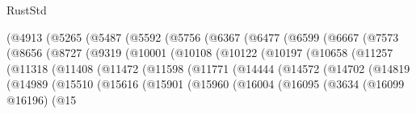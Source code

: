 \begin{lexlean}{RustStd}
\begin{coremodule}
                      (@4913
                        (@5265
                          (@5487
                            (@5592
                              (@5756
                                (@6367
                                  (@6477
                                    (@6599
                                      (@6667
                                        (@7573
                                          (@8656
                                            (@8727
                                              (@9319
                                                (@10001
                                                  (@10108
                                                    (@10122
                                                      (@10197
                                                        (@10658
                                                          (@11257
                                                            (@11318
                                                              (@11408
                                                                (@11472
                                                                  (@11598
                                                                    (@11771
                                                                      (@14444
                                                                        (@14572
                                                                          (@14702
                                                                            (@14819
                                                                              (@14989
                                                                                (@15510
                                                                                  (@15616
                                                                                    (@15901
                                                                                      (@15960
                                                                                        (@16004
                                                                                          (@16095
                                                                                            (@3634
                                                                                              (@16099
                                                                                                @16196)
                                                                                              (@15

\end{coremodule}
\end{lexlean}
